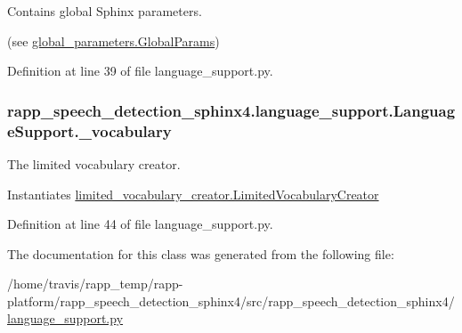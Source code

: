 Contains global Sphinx parameters. 

(see \hyperlink{classrapp__speech__detection__sphinx4_1_1global__parameters_1_1GlobalParams}{global\-\_\-parameters.\-Global\-Params}) 

Definition at line 39 of file language\-\_\-support.\-py.

\hypertarget{classrapp__speech__detection__sphinx4_1_1language__support_1_1LanguageSupport_a24caae7e914e0d89f6baf5d59298cda9}{
\subsubsection[{\-\_\-vocabulary}]{\setlength{\rightskip}{0pt plus 5cm}rapp\-\_\-speech\-\_\-detection\-\_\-sphinx4.\-language\-\_\-support.\-Language\-Support.\-\_\-vocabulary\hspace{0.3cm}{\ttfamily [private]}}}\label{classrapp__speech__detection__sphinx4_1_1language__support_1_1LanguageSupport_a24caae7e914e0d89f6baf5d59298cda9}


The limited vocabulary creator. 

Instantiates \hyperlink{classrapp__speech__detection__sphinx4_1_1limited__vocabulary__creator_1_1LimitedVocabularyCreator}{limited\-\_\-vocabulary\-\_\-creator.\-Limited\-Vocabulary\-Creator} 

Definition at line 44 of file language\-\_\-support.\-py.



The documentation for this class was generated from the following file\-:\begin{DoxyCompactItemize}
\item 
/home/travis/rapp\-\_\-temp/rapp-\/platform/rapp\-\_\-speech\-\_\-detection\-\_\-sphinx4/src/rapp\-\_\-speech\-\_\-detection\-\_\-sphinx4/\hyperlink{language__support_8py}{language\-\_\-support.\-py}\end{DoxyCompactItemize}

